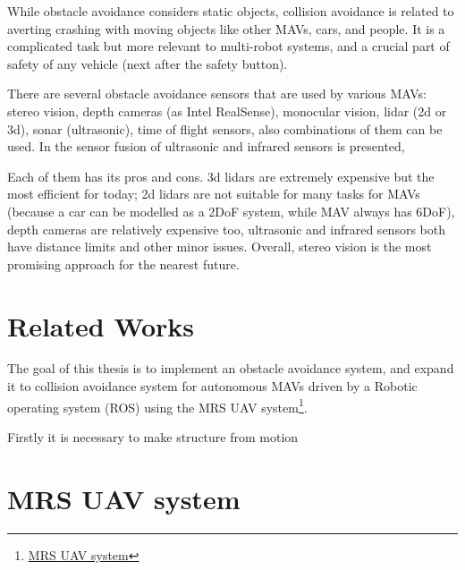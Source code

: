 While obstacle avoidance considers static objects, collision avoidance is related to averting crashing with moving objects like other MAVs, cars, and people. It is a complicated task but more relevant to multi-robot systems, and a crucial part of safety of any vehicle (next after the safety button).

There are several obstacle avoidance sensors that are used by various MAVs: stereo vision, depth cameras (as Intel RealSense), monocular vision, lidar (2d or 3d)\cite{Ramasamy2016}, sonar (ultrasonic), time of flight sensors, also combinations of them can be used. In \cite{Rambabu2015} the sensor fusion of ultrasonic and infrared sensors is presented, 

Each of them has its pros and cons. 3d lidars are extremely expensive but the most efficient for today; 2d lidars are not suitable for many tasks for MAVs (because a car can be modelled as a 2DoF system, while MAV always has 6DoF), depth cameras are relatively expensive too, ultrasonic and infrared sensors both have distance limits and other minor issues. Overall, stereo vision is the most promising approach for the nearest future.

\section{Related Works}

The goal of this thesis is to implement an obstacle avoidance system, and expand it to collision avoidance system for autonomous MAVs driven by a Robotic operating system (ROS) using the MRS UAV system\footnote{\href{https://github.com/ctu-mrs/mrs_uav_system}{MRS UAV system}}. 

Firstly it is necessary to make structure from motion 


\section{MRS UAV system}
